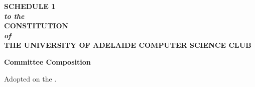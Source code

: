 \begin{titlepage}
    \begin{center}
        \vspace{1cm}

        \huge\textbf{SCHEDULE 1} \\
        \LARGE\textbf{\textit{to the}} \\
        \huge\textbf{CONSTITUTION} \\
        \LARGE\textbf{\textit{of}} \\
        \huge\textbf{THE UNIVERSITY OF ADELAIDE COMPUTER SCIENCE CLUB}

        \vfill
        \huge\textbf{Committee Composition}
        \vfill

        \Large
        Adopted on the \adoptedLongDate.
    \end{center}
\end{titlepage}
